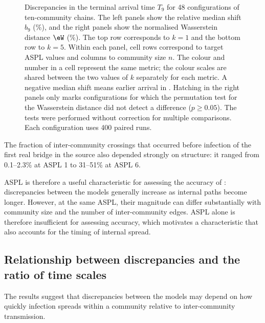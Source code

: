 \begin{figure}[tbp]
\caption{%
Discrepancies in the terminal arrival time $T_9$ for 48 configurations of ten-community chains.
The left panels show the relative median shift $b_9$ (\%), and the right panels show the normalised Wasserstein distance $\eW$ (\%). The top row corresponds to $k=1$ and the bottom row to $k=5$.
Within each panel, cell rows correspond to target ASPL values and columns to community size $n$.
The colour and number in a cell represent the same metric; the colour scales are shared between the two values of $k$ separately for each metric.
A negative median shift means earlier arrival in \TS{}.
Hatching in the right panels only marks configurations for which the permutation test for the Wasserstein distance did not detect a difference ($p\geq0.05$).
The tests were performed without correction for multiple comparisons.
Each configuration uses 400 paired runs.
}
\label{fig:accuracy_map}
\end{figure}

The fraction of \TS{} inter-community crossings that occurred before infection of the first real bridge in the source also depended strongly on structure: it ranged from 0.1--2.3\% at ASPL 1 to 31--51\% at ASPL 6.

ASPL is therefore a useful characteristic for assessing the accuracy of \TS{}: discrepancies between the models generally increase as internal paths become longer. However, at the same ASPL, their magnitude can differ substantially with community size and the number of inter-community edges. ASPL alone is therefore insufficient for assessing accuracy, which motivates a characteristic that also accounts for the timing of internal spread.


\subsection{Relationship between discrepancies and the ratio of time scales}
\label{sec:res_descriptor}

The results suggest that discrepancies between the models may depend on how quickly infection spreads within a community relative to inter-community transmission.

